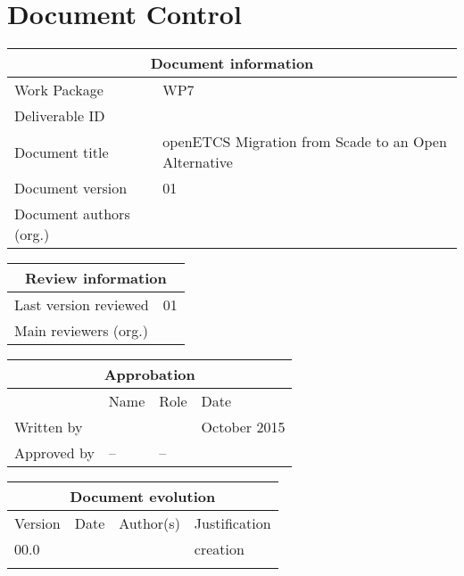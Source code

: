 \documentclass{template/openetcs_report}
\begin{document}
\maketitle
\tableofcontents
\listoffiguresandtables
\newpage

\chapter{Document Control}

\begin{tabular}{|p{4.4cm}|p{8.7cm}|}
\hline
\multicolumn{2}{|c|}{Document information} \\
\hline
Work Package &  WP7  \\
Deliverable ID & \\
\hline
Document title & openETCS Migration from Scade to an Open Alternative \\
Document version & 01 \\
Document authors (org.)  & \\
\hline
\end{tabular}

\begin{tabular}{|p{4.4cm}|p{8.7cm}|}
\hline
\multicolumn{2}{|c|}{Review information} \\
\hline
Last version reviewed & 01 \\
\hline
Main reviewers (org.) &  \\
\hline
\end{tabular}

\begin{tabular}{|p{2.2cm}|p{4cm}|p{4cm}|p{2cm}|}
\hline
\multicolumn{4}{|c|}{Approbation} \\
\hline
  &  Name & Role & Date   \\
\hline  
Written by    &  &   &  October 2015\\
\hline
Approved by & -- & -- & \\
\hline
\end{tabular}

\begin{tabular}{|p{2.2cm}|p{2cm}|p{3cm}|p{5cm}|}
\hline
\multicolumn{4}{|c|}{Document evolution} \\
\hline
Version &  Date & Author(s) & Justification  \\
\hline
00.0 &  &  & creation \\
\hline  
 & &  &   \\
\hline  
\end{tabular}
\newpage
\end{document}

